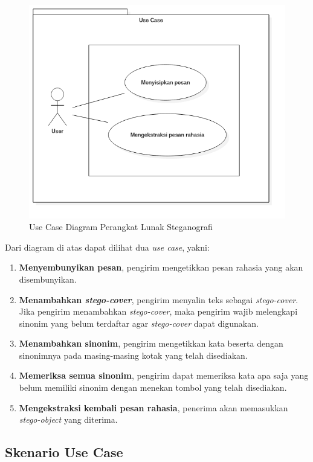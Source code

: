 \begin{figure}[H]
	\centering
	\includegraphics[scale=0.5]{Gambar/usecase}
	\caption{Use Case Diagram Perangkat Lunak Steganografi} 
	\label{fig:3_usecase}
\end{figure}

Dari diagram di atas dapat dilihat dua \textit{use case}, yakni:
\begin{enumerate}
	\item \textbf{Menyembunyikan pesan}, pengirim mengetikkan pesan rahasia yang akan disembunyikan.
	\item \textbf{Menambahkan \textit{stego-cover}}, pengirim menyalin teks sebagai \textit{stego-cover}. Jika pengirim menambahkan \textit{stego-cover}, maka pengirim wajib melengkapi sinonim yang belum terdaftar agar \textit{stego-cover} dapat digunakan.
	\item \textbf{Menambahkan sinonim}, pengirim mengetikkan kata beserta dengan sinonimnya pada masing-masing kotak yang telah disediakan.
	\item \textbf{Memeriksa semua sinonim}, pengirim dapat memeriksa kata apa saja yang belum memiliki sinonim dengan menekan tombol yang telah disediakan.
	\item \textbf{Mengekstraksi kembali pesan rahasia}, penerima akan memasukkan \textit{stego-object} yang diterima.
\end{enumerate}

\subsection{Skenario Use Case}

